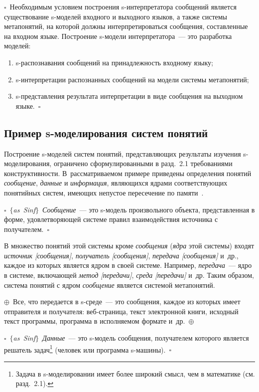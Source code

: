 \begin{multicols}{2}
\noindent $\square$~Необходимым условием построения s-ин\-тер\-пре\-та\-то\-ра 
сообщений является существование s-мо\-де\-лей входного и выходного языков, а 
также системы метапонятий, на которой должны интерпретироваться сообщения, 
составленные на входном языке. Построение s-мо\-де\-ли интерпретатора~--- это 
разработка моделей:
\begin{enumerate}[(1)]
\item s-распознавания сообщений на принадлежность входному языку;
\item s-интерпретации распознанных сообщений на модели системы
метапонятий;
\item s-представления результата интерпретации в виде сообщения на
выходном языке.~$\square$
\end{enumerate}

\subsection{Пример s-моделирования систем понятий} %

Построение s-мо\-де\-лей систем понятий, пред\-став\-ля\-ющих результаты 
изучения s-мо\-де\-ли\-ро\-ва\-ния, ограничено сформулированными в разд.~2.1 
требованиями конструктивности. В~рассматриваемом примере приведены определения 
понятий \textit{сообщение}, \textit{данные} и \textit{информация}, являющихся 
ядрами соответствующих понятийных систем, име\-ющих не\-пус\-тое пересечение по 
памяти~\cite{7il}.

\noindent
$\square$~$\{$\textit{as~Sinf}$\}$~\textit{Сообщение}~--- это s-модель
произвольного объекта, представленная в форме, удовлетворяющей системе
правил взаимодействия источника с получателем.~$\square$

В множество понятий этой системы кроме \textit{сообщения} (\textit{ядра}
этой системы) входят \textit{источник [сообщения]}, \textit{получатель
[сообщения]}, \textit{передача [сообщения]} и~др., каждое из которых является
ядром в своей сис\-те\-ме. Например, \textit{передача}~--- ядро в сис\-те\-ме,
включающей \textit{метод [передачи]}, \textit{среда [передачи]} и~др. Таким
образом, система понятий с ядром \textit{сообщение} является системой
метапонятий.

\noindent
$\oplus$~Все, что передается в s-среде~--- это сообщения, каждое из которых
имеет отправителя и получателя: веб-страница, текст электронной книги,
исходный текст программы, программа в исполняемом формате и~др.~$\oplus$

\noindent
$\square$~$\{$\textit{as~Sinf}$\}$~\textit{Данные}~--- это s-модель сообщения, получателем которого
является решатель задач\footnote{Задача в s-моделировании имеет более широкий смысл, чем в
математике (см. разд.~2.1).} (человек или программа s-машины).~$\square$


\end{multicols}
